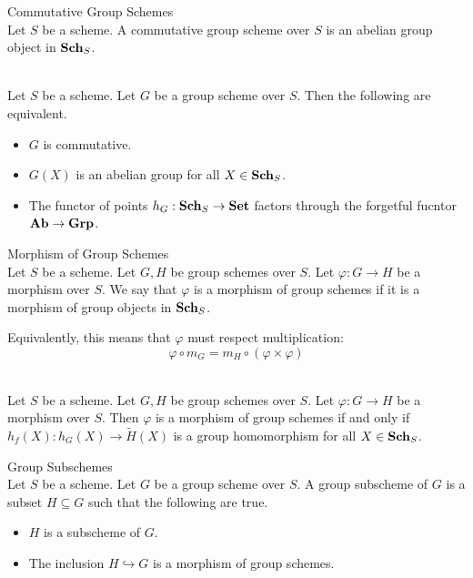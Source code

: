 \documentclass[a4paper]{article}
\begin{document}
\begin{defn}{Commutative Group Schemes}{}\\
Let $S$ be a scheme. A commutative group scheme over $S$ is an abelian group object in $\bold{Sch}_S$. 
\end{defn}

\begin{lmm}{}{}\\
Let $S$ be a scheme. Let $G$ be a group scheme over $S$. Then the following are equivalent. 
\begin{itemize}
\item $G$ is commutative. 
\item $G(X)$ is an abelian group for all $X\in\bold{Sch}_S$. 
\item The functor of points $h_G:\bold{Sch}_S\to\bold{Set}$ factors through the forgetful fucntor $\bold{Ab}\to\bold{Grp}$. 
\end{itemize}
\end{lmm}

\begin{defn}{Morphism of Group Schemes}{}\\
Let $S$ be a scheme. Let $G,H$ be group schemes over $S$. Let $\varphi:G\to H$ be a morphism over $S$. We say that $\varphi$ is a morphism of group schemes if it is a morphism of group objects in $\bold{Sch}_S$. 
\end{defn}

Equivalently, this means that $\varphi$ must respect multiplication: $$\varphi\circ m_G=m_H\circ(\varphi\times\varphi)$$

\begin{lmm}{}{}\\
Let $S$ be a scheme. Let $G,H$ be group schemes over $S$. Let $\varphi:G\to H$ be a morphism over $S$. Then $\varphi$ is a morphism of group schemes if and only if $h_f(X):h_G(X)\to\widetilde{H}(X)$ is a group homomorphism for all $X\in\bold{Sch}_S$. 
\end{lmm}

\begin{defn}{Group Subschemes}{}\\
Let $S$ be a scheme. Let $G$ be a group scheme over $S$. A group subscheme of $G$ is a subset $H\subseteq G$ such that the following are true. 
\begin{itemize}
\item $H$ is a subscheme of $G$. 
\item The inclusion $H\hookrightarrow G$ is a morphism of group schemes. 
\end{itemize}
\end{defn}
\end{document}
